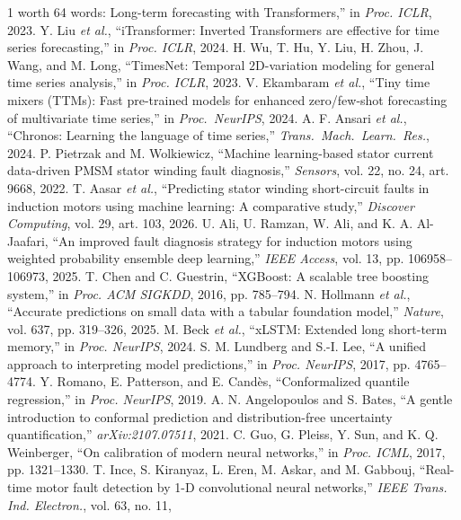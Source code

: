 \documentclass[journal]{IEEEtran}
\begin{document}
\begin{thebibliography}{1}
worth 64 words: Long-term forecasting with Transformers,'' in \emph{Proc. ICLR}, 2023.
 Y. Liu \emph{et al.}, ``iTransformer: Inverted Transformers are effective
for time series forecasting,'' in \emph{Proc. ICLR}, 2024.
 H. Wu, T. Hu, Y. Liu, H. Zhou, J. Wang, and M. Long, ``TimesNet: Temporal
$2$D-variation modeling for general time series analysis,'' in \emph{Proc. ICLR}, 2023.
 V. Ekambaram \emph{et al.}, ``Tiny time mixers (TTMs): Fast pre-trained
models for enhanced zero/few-shot forecasting of multivariate time series,'' in \emph{Proc.\
NeurIPS}, 2024.
 A. F. Ansari \emph{et al.}, ``Chronos: Learning the language of time
series,'' \emph{Trans.\ Mach.\ Learn.\ Res.}, 2024.
 P. Pietrzak and M. Wolkiewicz, ``Machine learning-based stator current
data-driven PMSM stator winding fault diagnosis,'' \emph{Sensors}, vol. 22, no. 24, art. 9668, 2022.
\bibitem{aasar2026} T. Aasar \emph{et al.}, ``Predicting stator winding short-circuit faults in
induction motors using machine learning: A comparative study,'' \emph{Discover Computing}, vol. 29,
art. 103, 2026.
 U. Ali, U. Ramzan, W. Ali, and K. A. Al-Jaafari, ``An improved fault diagnosis
strategy for induction motors using weighted probability ensemble deep learning,'' \emph{IEEE
Access}, vol. 13, pp. 106958--106973, 2025.
 T. Chen and C. Guestrin, ``XGBoost: A scalable tree boosting system,'' in
\emph{Proc. ACM SIGKDD}, 2016, pp. 785--794.
 N. Hollmann \emph{et al.}, ``Accurate predictions on small data with a tabular
foundation model,'' \emph{Nature}, vol. 637, pp. 319--326, 2025.
\bibitem{beck2024} M. Beck \emph{et al.}, ``xLSTM: Extended long short-term memory,'' in \emph{Proc.
NeurIPS}, 2024.
 S. M. Lundberg and S.-I. Lee, ``A unified approach to interpreting model
predictions,'' in \emph{Proc. NeurIPS}, 2017, pp. 4765--4774.
 Y. Romano, E. Patterson, and E. Candès, ``Conformalized quantile regression,''
in \emph{Proc. NeurIPS}, 2019.
 A. N. Angelopoulos and S. Bates, ``A gentle introduction to conformal
prediction and distribution-free uncertainty quantification,'' \emph{arXiv:2107.07511}, 2021.
\bibitem{guo2017} C. Guo, G. Pleiss, Y. Sun, and K. Q. Weinberger, ``On calibration of modern neural
networks,'' in \emph{Proc. ICML}, 2017, pp. 1321--1330.
 T. Ince, S. Kiranyaz, L. Eren, M. Askar, and M. Gabbouj, ``Real-time motor fault
detection by 1-D convolutional neural networks,'' \emph{IEEE Trans. Ind. Electron.}, vol. 63, no. 11,

\end{thebibliography}
\end{document}
